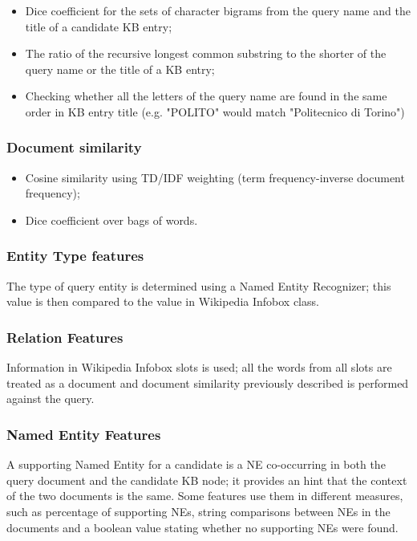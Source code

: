 \documentclass[a4paper,11pt]{report}
\begin{document}
\begin{itemize}
\item Dice coefficient for the sets of character bigrams from the query name and the title of a candidate KB entry;
\item The ratio of the recursive longest common substring to the shorter of the query name or the title of a KB entry;
\item Checking whether all the letters of the query name are found in the same order in KB entry title (e.g. "POLITO" would match "Politecnico di Torino")
\end{itemize}

\subsubsection{Document similarity}

\begin{itemize}
\item Cosine similarity using TD/IDF weighting (term frequency-inverse document frequency);
\item Dice coefficient over bags of words.
\end{itemize}

\subsubsection{Entity Type features}
The type of query entity is determined using a Named Entity Recognizer; this value is then compared to the value in Wikipedia Infobox class.

\subsubsection{Relation Features}
Information in Wikipedia Infobox slots is used; all the words from all slots are treated as a document and document similarity previously described is performed against the query.

\subsubsection{Named Entity Features}
A supporting Named Entity for a candidate is a NE co-occurring in both the query document and the candidate KB node; it provides an hint that the context of the two documents is the same. Some features use them in different measures, such as percentage of supporting NEs, string comparisons between NEs in the documents and a boolean value stating whether no supporting NEs were found.
\end{document}
